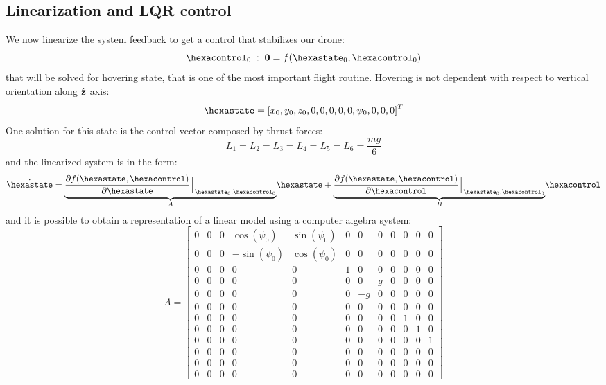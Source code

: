 \subsection{Linearization and LQR control}
We now linearize the system feedback to get a control that stabilizes our drone:
\begin{equation}
\hexacontrol_0 \; : \; \mathbf{0}=f(\hexastate_0, \hexacontrol_0)
\end{equation}
that will be solved for hovering state, that is one of the most important flight routine. Hovering is not dependent with respect to vertical orientation along $\hat{\mathbf{z}}$ axis:
\[
\hexastate = \left[ x_0, y_0, z_0,0,0,0,0,0,\psi_0,0,0,0 \right]^T
\]
One solution for this state is the control vector composed by thrust forces:
\[
L_1 = L_2 = L_3 = L_4 = L_5 = L_6 = \dfrac{mg}{6}
\]
and the linearized system is in the form:
\begin{equation}
\dot{\hexastate} = \underset{A}{\underbrace{\dfrac{\partial f(\hexastate,\hexacontrol)}{\partial \hexastate} \Big\rfloor_{\hexastate_0,\hexacontrol_0}}} \hexastate + \underset{B}{\underbrace{\dfrac{\partial f(\hexastate,\hexacontrol)}{\partial \hexacontrol} \Big\rfloor_{\hexastate_0,\hexacontrol_0}}} \hexacontrol
\end{equation}
and it is possible to obtain a representation of a linear model using a computer algebra system:
\renewcommand{\arraystretch}{1}
\begin{equation}
A = \left[ \begin{array}{cccccccccccc} 0&0&0&\cos \left( \psi_{{0}}
 \right) &\sin \left( \psi_{{0}} \right) &0&0&0&0&0&0&0
\\  0&0&0&-\sin \left( \psi_{{0}} \right) &\cos
 \left( \psi_{{0}} \right) &0&0&0&0&0&0&0\\  0&0&0&0&0
&1&0&0&0&0&0&0\\  0&0&0&0&0&0&0&g&0&0&0&0
\\  0&0&0&0&0&0&-g&0&0&0&0&0\\  0&0&0
&0&0&0&0&0&0&0&0&0\\  0&0&0&0&0&0&0&0&0&1&0&0
\\  0&0&0&0&0&0&0&0&0&0&1&0\\  0&0&0
&0&0&0&0&0&0&0&0&1\\  0&0&0&0&0&0&0&0&0&0&0&0
\\  0&0&0&0&0&0&0&0&0&0&0&0\\  0&0&0
&0&0&0&0&0&0&0&0&0\end{array} \right]
\end{equation}
